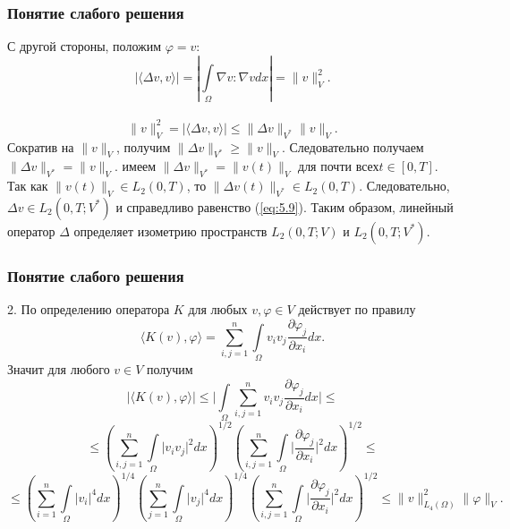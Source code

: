 \documentclass[10pt, pdf, hyperref={unicode}]{beamer}
\begin{document}
  \begin{frame}
    \frametitle{Понятие слабого решения}
    \begin{center}
      \begin{minipage}[h]{0.97\linewidth}
        С другой стороны, положим $\varphi=v:$\\
        $$|\langle \Delta v,v \rangle|=|\int\limits_{\Omega}\nabla v:\nabla v dx|=\|v\|_V^2.$$\\
        $$\|v\|_V^2=|\langle \Delta v,v\rangle|\le\|\Delta v\|_{V^*}\| v\|_{V}.$$
        Сократив на $\|v\|_V$, получим $\|\Delta v\|_{V^*}\ge\|v\|_V.$
        Следовательно получаем $\|\Delta v\|_{V^*}=\|v\|_V.$
        имеем
        $\| \Delta v \|_{V^\ast} = \| v(t) \|_V$ для почти всех\linebreak$t \in [0, T]$. Так как $\| v(t) \|_V \in L_2(0, T)$,
        то $\| \Delta v(t)\|_{V^*} \in L_2(0, T)$. Следовательно, $\Delta v \in L_2(0, T; V^\ast)$ и справедливо
        равенство (\ref{eq:5.9}). Таким образом, линейный оператор $\Delta$ определяет изометрию пространств $L_2(0, T; V)$ и $L_2(0, T; V^\ast)$.
      \end{minipage}
    \end{center}
  \end{frame}

  \begin{frame}
    \frametitle{Понятие слабого решения}
    \begin{center}
      \begin{minipage}[h]{0.97\linewidth}
      2. По определению оператора $K$ для любых $v,\varphi\in V$ действует по правилу
        $$\langle K(v),\varphi \rangle = \sum_{i,j=1}^{n}\int\limits_\Omega v_i v_j \frac{\partial \varphi_j}{\partial x_i}dx.$$
        Значит для любого $v\in V$ получим
        $$\bigg|\langle K(v),\varphi \rangle\bigg|\le\bigg|\int\limits_{\Omega}\sum_{i,j=1}^{n}v_i v_j \frac{\partial \varphi_j}{\partial x_i}dx\bigg|\le$$
        $$\le(\sum_{i,j=1}^{n}\int\limits_{\Omega}\bigg|v_i v_j\bigg|^2 dx)^{1/2}(\sum_{i,j=1}^{n}\int\limits_{\Omega}\bigg|\frac{\partial \varphi_j}{\partial x_i}\bigg|^2 dx)^{1/2}\le$$
        $$\le(\sum_{i=1}^{n}\int\limits_{\Omega}\bigg|v_i\bigg|^4 dx)^{1/4}(\sum_{j=1}^{n}\int\limits_{\Omega}\bigg|v_j\bigg|^4 dx)^{1/4}
        (\sum_{i,j=1}^{n}\int\limits_{\Omega}\bigg|\frac{\partial \varphi_j}{\partial x_i}\bigg|^2 dx)^{1/2}\le
        \|v\|^2_{L_4(\Omega)}\|\varphi\|_V.$$
      \end{minipage}
    \end{center}
  \end{frame}
\end{document}
